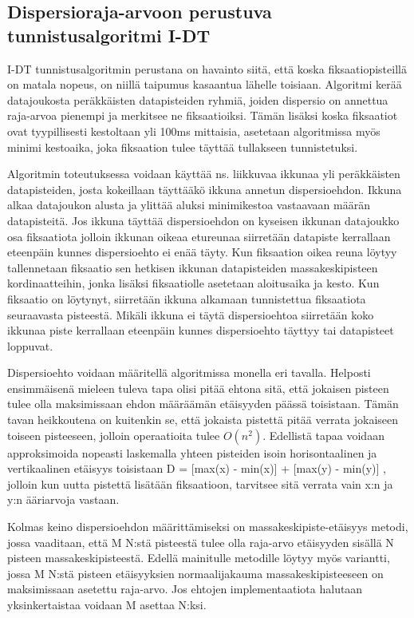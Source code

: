 \subsection{Dispersioraja-arvoon perustuva tunnistusalgoritmi I-DT}
I-DT tunnistusalgoritmin perustana on havainto siitä, että koska fiksaatiopisteillä on matala nopeus, on niillä taipumus kasaantua lähelle toisiaan. Algoritmi kerää datajoukosta peräkkäisten datapisteiden ryhmiä, joiden dispersio on annettua raja-arvoa pienempi ja merkitsee ne fiksaatioiksi. Tämän lisäksi koska fiksaatiot ovat tyypillisesti kestoltaan yli 100ms mittaisia, asetetaan algoritmissa myös minimi kestoaika, joka fiksaation tulee täyttää tullakseen tunnistetuksi. \citep[s. 74]{salvucci2000}

Algoritmin toteutuksessa voidaan käyttää ns. liikkuvaa ikkunaa yli peräkkäisten datapisteiden, josta kokeillaan täyttääkö ikkuna annetun dispersioehdon. Ikkuna alkaa datajoukon alusta ja ylittää aluksi minimikestoa vastaavaan määrän datapisteitä. Jos ikkuna täyttää dispersioehdon on kyseisen ikkunan datajoukko osa fiksaatiota jolloin ikkunan oikeaa etureunaa siirretään datapiste kerrallaan eteenpäin kunnes dispersioehto ei enää täyty. Kun fiksaation oikea reuna löytyy tallennetaan fiksaatio sen hetkisen ikkunan datapisteiden massakeskipisteen kordinaatteihin, jonka lisäksi fiksaatiolle asetetaan aloitusaika ja kesto. Kun fiksaatio on löytynyt, siirretään ikkuna alkamaan tunnistettua fiksaatiota seuraavasta pisteestä. Mikäli ikkuna ei täytä dispersioehtoa siirretään koko ikkunaa piste kerrallaan eteenpäin kunnes dispersioehto täyttyy tai datapisteet loppuvat. \citep[s.26-27]{gale1984}

Dispersioehto voidaan määritellä algoritmissa monella eri tavalla. Helposti ensimmäisenä mieleen tuleva tapa olisi pitää ehtona sitä, että jokaisen pisteen tulee olla maksimissaan ehdon määräämän etäisyyden päässä toisistaan. Tämän tavan heikkoutena on kuitenkin se, että jokaista pistettä pitää verrata jokaiseen toiseen pisteeseen, jolloin operaatioita tulee \(O(n^2)\). \citep[s.111] {shic2008} Edellistä tapaa voidaan approksimoida nopeasti laskemalla yhteen pisteiden isoin horisontaalinen ja vertikaalinen etäisyys toisistaan D = [max(x) - min(x)] + [max(y) - min(y)] \citep[s. 74]{salvucci2000}, jolloin kun uutta pistettä lisätään fiksaatioon, tarvitsee sitä verrata vain x:n ja y:n ääriarvoja vastaan.

Kolmas keino dispersioehdon määrittämiseksi on massakeskipiste-etäisyys metodi, jossa vaaditaan, että M N:stä pisteestä tulee olla raja-arvo etäisyyden sisällä N pisteen massakeskipisteestä. Edellä mainitulle metodille löytyy myös variantti, jossa M N:stä pisteen etäisyyksien normaalijakauma massakeskipisteeseen on maksimissaan asetettu raja-arvo. Jos ehtojen implementaatiota halutaan yksinkertaistaa voidaan M asettaa N:ksi. \citep[s.111] {shic2008}


